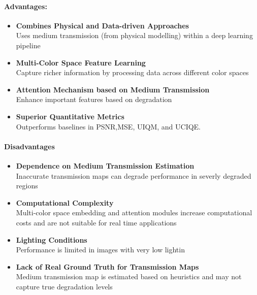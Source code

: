 \documentclass{article}
\begin{document}
\paragraph{Advantages:}
\begin{itemize}
    \item \textbf{Combines Physical and Data-driven Approaches} \\
          Uses medium transmission (from physical modelling) within a deep learning pipeline

    \item \textbf{Multi-Color Space Feature Learning} \\
          Capture richer information by processing data across different color spaces
    
    \item \textbf{Attention Mechanism based on Medium Transmission} \\
          Enhance important features based on degradation

    \item \textbf{Superior Quantitative Metrics} \\
          Outperforms baselines in PSNR,MSE, UIQM, and UCIQE.
\end{itemize}

\paragraph{Disadvantages}

\begin{itemize}
    \item \textbf{Dependence on Medium Transmission Estimation} \\
          Inaccurate transmission maps can degrade performance in severly degraded regions

    \item \textbf{Computational Complexity} \\
          Multi-color space embedding and attention modules increase computational costs and are not suitable for real time applications

    \item \textbf{Lighting Conditions} \\
          Performance is limited in images with very low lightin

    \item \textbf{Lack of Real Ground Truth for Transmission Maps} \\
          Medium transmission map is estimated based on heuristics and may not capture true degradation levels
\end{itemize}
\end{document}
